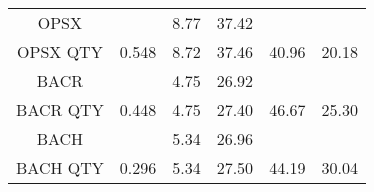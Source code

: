 \documentclass[fleqn,10pt,lineno]{manuscript}
\begin{document}
\begin{table}[]
\begin{tabular}{cccccc}
		\midrule
		OPSX     &                 & 8.77 & 37.42    &                   &                        \\
		OPSX QTY & 0.548           & 8.72 & 37.46    & 40.96             & 20.18                  \\
		\midrule
		BACR     &                 & 4.75 & 26.92    &                   &                        \\
		BACR QTY & 0.448           & 4.75 & 27.40    & 46.67             & 25.30                  \\
		\midrule
		BACH     &                 & 5.34 & 26.96    &                   &                        \\
		BACH QTY & 0.296           & 5.34 & 27.50    & 44.19             & 30.04                  \\
		\bottomrule
	\end{tabular}
\end{table}
\end{document}

